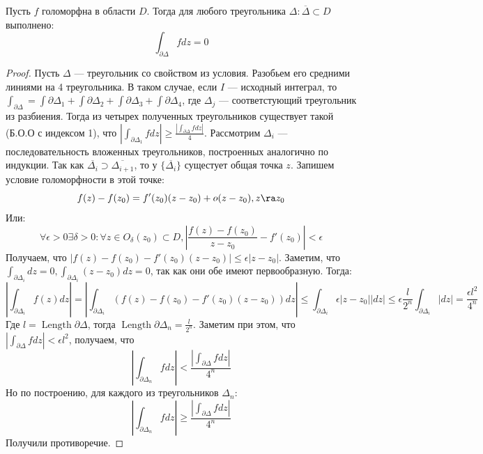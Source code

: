 \begin{lemma}[Гурса]
    Пусть \(f\) голоморфна в области \(D\). Тогда для любого треугольника \(\Delta: \overline{\Delta} \subset D\) выполнено:
    \[\int_{\partial \Delta} fdz = 0\]
\end{lemma}
\begin{proof}
    Пусть \(\Delta\) --- треугольник со свойством из условия. Разобьем его средними линиями на 4 треугольника. В таком случае, если \(I\) --- исходный интеграл, то \(\int_{\partial \Delta} = \int{\partial \Delta_1} + \int{\partial \Delta_2} + \int{\partial \Delta_3} + \int{\partial \Delta_4}\), где \(\Delta_j\) --- соответстующий треугольник из разбиения. Тогда из четырех полученных треугольников существует такой (Б.О.О с индексом 1), что \(\left|\int_{\partial \Delta_1} fdz\right| \ge \frac{\left| \int_{\partial \Delta} fdz\right|}{4}\). Рассмотрим \(\Delta_i\) --- последовательность вложенных треугольников, построенных аналогично по индукции. Так как \(\overline{\Delta_i} \supset \overline{\Delta_{i + 1}}\), то у \(\{\overline{\Delta_i}\}\) сущестует общая точка \(z\). Запишем условие голоморфности в этой точке:
    \[f(z) - f(z_0) = f'(z_0)(z - z_0) + o(z - z_0), z \ra z_0\]
    Или:
    \[\forall \epsilon > 0 \exists \delta > 0: \forall z \in O_\delta(z_0) \subset D, \left| \frac{f(z) - f(z_0)}{z - z_0} - f'(z_0) \right| < \epsilon\]
    Получаем, что \(|f(z) - f(z_0) - f'(z_0)(z - z_0)| \le \epsilon|z - z_0|\). Заметим, что \(\int_{\partial \Delta_i} dz = 0, \int_{\partial \Delta_i} (z - z_0)dz = 0\), так как они обе имеют первообразную. Тогда:
    \[\left| \int_{\partial \Delta_i} f(z)dz \right| = \left| \int_{\partial \Delta_i} (f(z) - f(z_0) - f'(z_0)(z - z_0)) dz\right| \le \int_{\partial \Delta_i} \epsilon|z - z_0||dz| \le \epsilon \frac{l}{2^n}\int_{\partial \Delta_i}|dz| = \frac{\epsilon l^2}{4^n}\]
    Где \(l = \operatorname{Length} \partial\Delta\), тогда \(\operatorname{Length} \partial\Delta_n = \frac{l}{2^n}\). Заметим при этом, что \(\left| \int_{\partial \Delta} fdz \right| < \epsilon l^2\), получаем, что 
    \[\left|\int_{\partial \Delta_n} fdz\right| < \frac{\left| \int_{\partial \Delta} fdz\right|}{4^n}\]
    Но по построению, для каждого из треугольников \(\Delta_n\):
    \[\left|\int_{\partial \Delta_n} fdz\right| \ge \frac{\left| \int_{\partial \Delta} fdz\right|}{4^n}\]
    Получили противоречие.
\end{proof}

